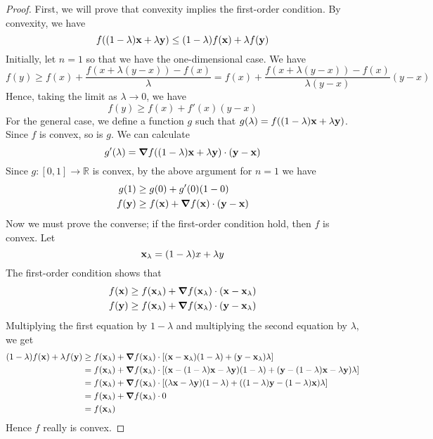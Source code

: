 \begin{proof}
    First, we will prove that convexity implies the first-order condition.
    By convexity, we have
    \[ f\qty((1-\lambda)\vb x + \lambda \vb y) \leq (1-\lambda)f(\vb x) + \lambda f(\vb y) \]
    Initially, let \(n=1\) so that we have the one-dimensional case.
    We have
    \[ f(y) \geq f(x) + \frac{f(x + \lambda(y-x)) - f(x)}{\lambda} = f(x) + \frac{f(x + \lambda(y-x)) - f(x)}{\lambda(y-x)}(y-x) \]
    Hence, taking the limit as \(\lambda \to 0\), we have
    \[ f(y) \geq f(x) + f'(x)(y-x) \]
    For the general case, we define a function \(g\) such that \(g(\lambda) = f((1-\lambda)\vb x + \lambda\vb y)\).
    Since \(f\) is convex, so is \(g\).
    We can calculate
    \[ g'(\lambda) = \grad{f((1-\lambda)\vb x + \lambda\vb y)} \cdot (\vb y - \vb x) \]
    Since \(g \colon [0, 1] \to \mathbb R\) is convex, by the above argument for \(n = 1\) we have
    \begin{align*}
        g(1) &\geq g(0) + g'(0) (1-0) \\
        f(\vb y) &\geq f(\vb x) + \grad{f(\vb x)} \cdot (\vb y - \vb x)
    \end{align*}
    Now we must prove the converse; if the first-order condition hold, then \(f\) is convex.
    Let
    \[ \vb x_\lambda = (1-\lambda)x + \lambda y \]
    The first-order condition shows that
    \begin{align*}
        f(\vb x) &\geq f(\vb x_\lambda) + \grad{f(\vb x_\lambda)} \cdot (\vb x - \vb x_\lambda) \\
        f(\vb y) &\geq f(\vb x_\lambda) + \grad{f(\vb x_\lambda)} \cdot (\vb y - \vb x_\lambda)
    \end{align*}
    Multiplying the first equation by \(1-\lambda\) and multiplying the second equation by \(\lambda\), we get
    \begin{align*}
        (1-\lambda)f(\vb x) + \lambda f(\vb y) & \geq f(\vb x_\lambda) + \grad{f(\vb x_\lambda)} \cdot \qty[(\vb x - \vb x_\lambda)(1-\lambda) + (\vb y - \vb x_\lambda)\lambda] \\
        &= f(\vb x_\lambda) + \grad{f(\vb x_\lambda)} \cdot \qty[(\vb x - (1-\lambda)\vb x - \lambda \vb y)(1-\lambda) + (\vb y - (1-\lambda)\vb x - \lambda \vb y)\lambda] \\
        &= f(\vb x_\lambda) + \grad{f(\vb x_\lambda)} \cdot \qty[(\lambda \vb x - \lambda \vb y)(1-\lambda) + ((1-\lambda)\vb y - (1-\lambda) \vb x)\lambda] \\
        &= f(\vb x_\lambda) + \grad{f(\vb x_\lambda)} \cdot 0 \\
        &= f(\vb x_\lambda)
    \end{align*}
    Hence \(f\) really is convex.
\end{proof}

